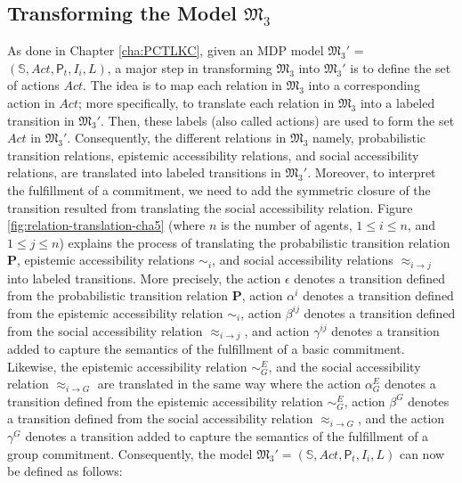 
\subsection{Transforming the Model $\mathfrak{M_3}$} \label{sec:reducing-proposed-model-cha5}

As done in Chapter \ref{cha:PCTLKC}, given an MDP model $\mathfrak{M_3'}$ = $(\mathbb{S}, Act, \textsf{P}_t ,I_i, L)$, a major step in transforming $\mathfrak{M_3}$ into $\mathfrak{M_3'}$ is to define the set of actions $Act$. The idea is to map each relation in $\mathfrak{M_3}$ into a corresponding action in $Act$; more specifically, to translate each relation in $\mathfrak{M_3}$ into a labeled transition in $\mathfrak{M_3'}$. Then, these labels (also called actions) are used to form the set $Act$ in $\mathfrak{M_3'}$. Consequently, the different relations in $\mathfrak{M_3}$ namely, probabilistic transition relations, epistemic accessibility relations, and social accessibility relations, are translated into labeled transitions in $\mathfrak{M_3'}$. Moreover, to interpret the fulfillment of a commitment, we need to add the symmetric closure of the transition resulted from translating the social accessibility relation. Figure \ref{fig:relation-translation-cha5} (where $n$ is the number of agents, $1 \leq i \leq n$, and $1 \leq j \leq n$) explains the process of translating the probabilistic transition relation $\textbf{P}$, epistemic accessibility relations $\sim_i$, and social accessibility relations $\approx_{i \to j}$ into labeled transitions. More precisely, the action $\epsilon$ denotes a transition defined from the probabilistic transition relation $\textbf{P}$, action $\alpha^i$ denotes a transition defined from the epistemic accessibility relation $\sim_i$, action $\beta^{ij}$ denotes a transition defined from the social accessibility relation $\approx_{i \rightarrow j}$, and action $\gamma^{ij}$ denotes a transition added to capture the semantics of the fulfillment of a basic commitment. Likewise, the epistemic accessibility relation $\sim_G^E$, and the social accessibility relation $\approx_{i \rightarrow G}$ are translated in the same way where the action $\alpha_G^E$ denotes a transition defined from the epistemic accessibility relation $\sim_G^E$, action $\beta^{G}$ denotes a transition defined from the social accessibility relation $\approx_{i \rightarrow G}$, and the action $\gamma^{G}$ denotes a transition added to capture the semantics of the fulfillment of a group commitment. Consequently, the model $\mathfrak{M_3'} = (\mathbb{S}, Act, \textsf{P}_t ,I_i, L)$ can now be defined as follows:


